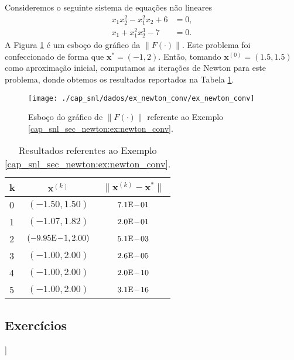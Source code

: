 \begin{ex}\label{cap_snl_sec_newton:ex:newton_conv}
  Consideremos o seguinte sistema de equações não lineares
  \begin{align}
    x_1x_2^2 - x_1^2x_2 + 6 &= 0,\\
    x_1 + x_1^2x_2^3 - 7 &= 0.
  \end{align}
  A Figura \ref{cap_snl_sec_newton:fig:ex_newton_conv} é um esboço do gráfico da $\|F(\cdot)\|$. Este problema foi confeccionado de forma que $\pmb{x}^* = (-1, 2)$. Então, tomando $\pmb{x}^{(0)} = (1.5, 1.5)$ como aproximação inicial, computamos as iterações de Newton para este problema, donde obtemos os resultados reportados na Tabela \ref{cap_snl_sec_newton:tab:ex_newton_conv}. 

  \begin{figure}[h!]
    \centering
    \texttt{[image: ./cap\_snl/dados/ex\_newton\_conv/ex\_newton\_conv]}
    \caption{Esboço do gráfico de $\|F(\cdot)\|$ referente ao Exemplo \ref{cap_snl_sec_newton:ex:newton_conv}.}
    \label{cap_snl_sec_newton:fig:ex_newton_conv}
  \end{figure}

  \begin{table}[H]
    \centering
    \begin{tabular}{lcc}
      k & $\pmb{x}^{(k)}$ & $\|\pmb{x}^{(k)} - \pmb{x}^*\|$\\\hline
      0 & $(-1.50, 1.50)$ & $7.1\mathrm{E}\!-\!01$\\
      1 & $(-1.07, 1.82)$ & $2.0\mathrm{E}\!-\!01$\\
      2 & $(-9.95\mathrm{E}\!-\!1, 2.00)$ & $5.1\mathrm{E}\!-\!03$\\
      3 & $(-1.00, 2.00)$ & $2.6\mathrm{E}\!-\!05$ \\
      4 & $(-1.00, 2.00)$ & $2.0\mathrm{E}\!-\!10$ \\
      5 & $(-1.00, 2.00)$ & $3.1\mathrm{E}\!-\!16$ \\\hline
    \end{tabular}
    \caption{Resultados referentes ao Exemplo \ref{cap_snl_sec_newton:ex:newton_conv}.}
    \label{cap_snl_sec_newton:tab:ex_newton_conv}
  \end{table}
\end{ex}

\subsection{Exercícios}

\begin{flushleft}
  [[tag:revisar]]
\end{flushleft}

